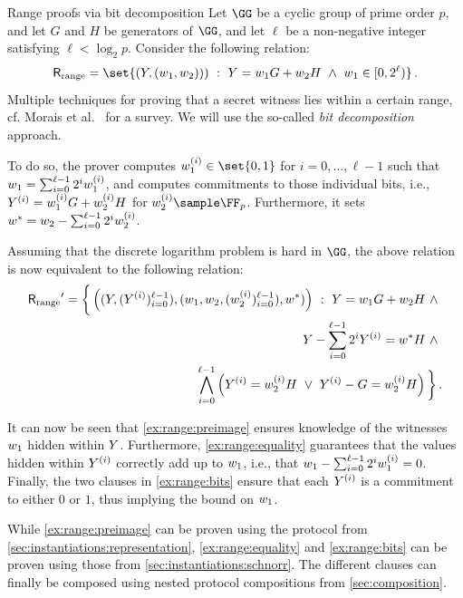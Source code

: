 \documentclass[11pt]{article}
\begin{document}
\begin{example}{Range proofs via bit decomposition}{}
  Let $\GG$ be a cyclic group of prime order $p$, and let $G$ and $H$ be generators of $\GG$, and let $\ell$ be a non-negative integer satisfying $\ell<\log_2 p$.
	Consider the following relation:
  $$
	  \relation[range] = \set{\left(\statement,(\witness_1,\witness_2))\right)~:~\statement=\witness_1 G +\witness_2 H ~\land~ \witness_1\in[0,2^\ell)}\,.
	$$
	Multiple techniques for proving that a secret witness lies within a certain range, cf. Morais et al.~\cite{range-proof-survey} for a survey.
	We will use the so-called \emph{bit decomposition} approach.

	To do so, the prover computes $\witness_1^{(i)}\in\set{0,1}$ for $i=0,\dots,\ell-1$ such that $\witness_1=\sum_{i=0}^{\ell-1}2^i\witness_1^{(i)}$, and computes commitments to those individual bits, i.e., $\statement^{(i)}=\witness_1^{(i)}G+\witness_2^{(i)}H$ for $\witness_2^{(i)}\sample\FF_p$.
	Furthermore, it sets $\witness^*=\witness_2-\sum_{i=0}^{\ell-1}2^i\witness_2^{(i)}$.

  Assuming that the discrete logarithm problem is hard in $\GG$, the above relation is now equivalent to the following relation:
  \begin{align}
	  \relation[range]' = \bigg\{\left((\statement,(\statement^{(i)})_{i=0}^{\ell-1}),(\witness_1,\witness_2,(\witness_2^{(i)})_{i=0}^{\ell-1}),\witness^*)\right)~:~ 		\statement=\witness_1 G +\witness_2 H ~\land~ \label{ex:range:preimage}\\
		\statement-\sum_{i=0}^{\ell-1} 2^i\statement^{(i)} = \witness^* H ~\land~  \label{ex:range:equality}\\
		\bigwedge_{i=0}^{\ell-1} \left(\statement^{(i)}=\witness_2^{(i)}H ~\lor~ \statement^{(i)}-G=\witness_2^{(i)}H\right)\bigg\}\,.\label{ex:range:bits}
	\end{align}

	It can now be seen that \cref{ex:range:preimage} ensures knowledge of the witnesses $\witness_1$ hidden within $\statement$.
	Furthermore, \cref{ex:range:equality} guarantees that the values hidden within $\statement^{(i)}$ correctly add up to $\witness_1$, i.e., that $\witness_1-\sum_{i=0}^{\ell-1}2^i\witness_1^{(i)}=0$.
  Finally, the two clauses in \cref{ex:range:bits} ensure that each $\statement^{(i)}$ is a commitment to either $0$ or $1$, thus implying the bound on $\witness_1$.

	While \cref{ex:range:preimage} can be proven using the protocol from \cref{sec:instantiations:representation}, \cref{ex:range:equality} and \cref{ex:range:bits} can be proven using those from \cref{sec:instantiations:schnorr}.
	The different clauses can finally be composed using nested protocol compositions from \cref{sec:composition}.
\end{example}
\end{document}
